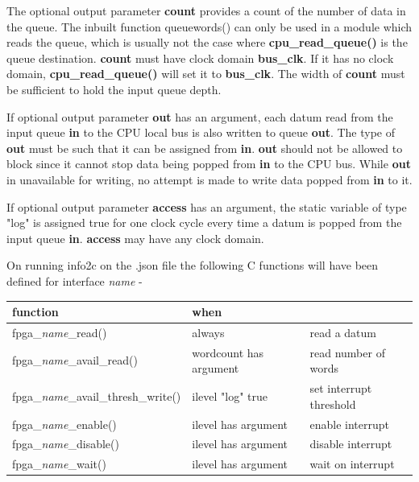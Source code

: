             The optional output parameter {\bf count} provides a count of the number
            of data in the queue. The inbuilt function queuewords() can only be used
            in a module which reads the queue, which is usually not the case where
            {\bf cpu\_read\_queue()} is the queue destination. {\bf count} must have
            clock domain {\bf bus\_clk}. If it has no clock domain, {\bf
            cpu\_read\_queue()} will set it to {\bf bus\_clk}. The width of {\bf
            count} must be sufficient to hold the input queue depth.

            If optional output parameter {\bf out} has an argument, each datum read
            from the input queue {\bf in} to the CPU local bus is also written to
            queue {\bf out}. The type of {\bf out} must be such that it can be
            assigned from {\bf in}. {\bf out} should not be allowed to block since
            it cannot stop data being popped from {\bf in} to the CPU bus. While
            {\bf out} in unavailable for writing, no attempt is made to write data
            popped from {\bf in} to it.

            If optional output parameter {\bf access} has an argument, the
            static variable of type "log" is assigned true for one clock cycle
            every time a datum is popped from the input queue {\bf in}. {\bf
            access} may have any clock domain.
            
            On running info2c on the .json file the following C functions will have
            been defined for interface {\em name} -
            
            \begin{tabular}{| l | l | l |}
            \hline
            function                                 & when                   &                         \\ \hline \hline
            fpga\_{\em name}\_read()                 & always                 & read a datum            \\ \hline
            fpga\_{\em name}\_avail\_read()          & wordcount has argument & read number of words    \\ \hline
            fpga\_{\em name}\_avail\_thresh\_write() & ilevel "log" true      & set interrupt threshold \\ \hline
            fpga\_{\em name}\_enable()               & ilevel has argument    & enable interrupt        \\ \hline
            fpga\_{\em name}\_disable()              & ilevel has argument    & disable interrupt       \\ \hline 
            fpga\_{\em name}\_wait()                 & ilevel has argument    & wait on interrupt       \\ \hline  
            \end{tabular}
            
